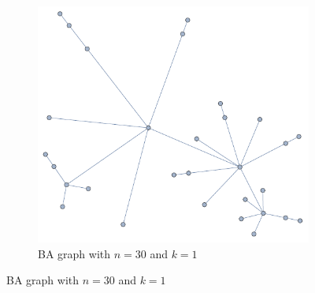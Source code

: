 \documentclass[english, twoside, 12pt, a4paper]{article}
\theoremstyle{definition}
\theoremstyle{plain}
\theoremstyle{remark}
\begin{document}
\begin{figure}[hbt]
\begin{subfigure}[t]{0.40\textwidth}
    \includegraphics[width=\textwidth]{../ramsza/figs/graph_ba.pdf}
    \caption{BA graph with \( n = 30 \) and \( k = 1\)}
    \label{fig:graphsb}
  \end{subfigure}
  

\end{figure}
\end{document}
